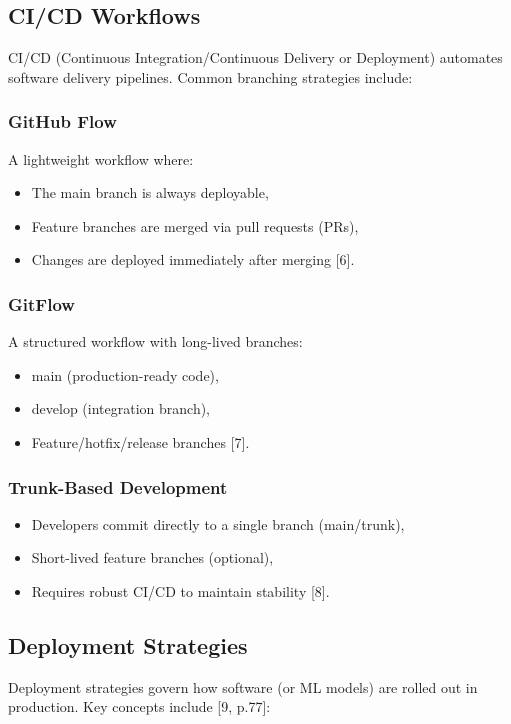 \subsection{CI/CD Workflows}
CI/CD
 (Continuous Integration/Continuous Delivery or Deployment) automates
software delivery pipelines. Common branching strategies include:

\subsubsection{GitHub Flow}
A lightweight workflow where:

\begin{itemize}
\item The main branch is always deployable,
\item Feature branches are merged via pull requests (PRs),
\item Changes are deployed immediately after merging [6].
\end{itemize}

\subsubsection*{GitFlow}
A structured workflow with long-lived branches:

\begin{itemize}
\item main (production-ready code),
\item develop (integration branch),
\item Feature/hotfix/release branches [7].
\end{itemize}
\subsubsection*{Trunk-Based Development}
\begin{itemize}
\item Developers commit directly to a single branch (main/trunk),
\item Short-lived feature branches (optional),
\item Requires robust CI/CD to maintain stability [8].
\end{itemize}

\subsection*{Deployment Strategies}
Deployment strategies govern how software (or ML models) are rolled out in production. Key concepts include [9, p.77]:

